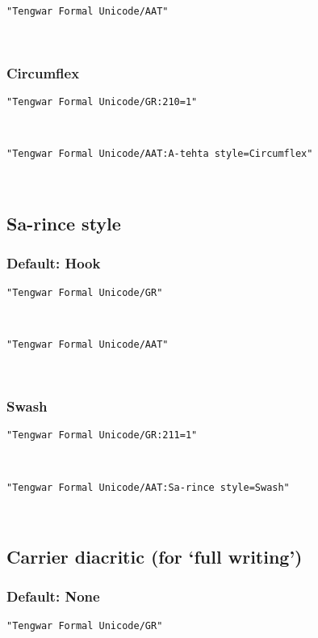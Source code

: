 \documentclass[11pt,a4paper]{article}
\begin{document}
\formalGR 

\noindent \texttt{"Tengwar Formal Unicode/AAT"}

\formalAAT 

\subsubsection{Circumflex}

\texttt{"Tengwar Formal Unicode/GR:210=1"}

\formalGRcircumflex 

\noindent \texttt{"Tengwar Formal Unicode/AAT:A-tehta style=Circumflex"}

\formalAATcircumflex 


\subsection{Sa-rince style}

\subsubsection{Default: Hook}

\texttt{"Tengwar Formal Unicode/GR"}

\formalGR 

\noindent \texttt{"Tengwar Formal Unicode/AAT"}

\formalAAT 

\subsubsection{Swash}

\texttt{"Tengwar Formal Unicode/GR:211=1"}

\formalGRswash 

\noindent \texttt{"Tengwar Formal Unicode/AAT:Sa-rince style=Swash"}

\formalAATswash 


\subsection{Carrier diacritic (for ‘full writing’)}

\subsubsection{Default: None}

\texttt{"Tengwar Formal Unicode/GR"}
\end{document}
